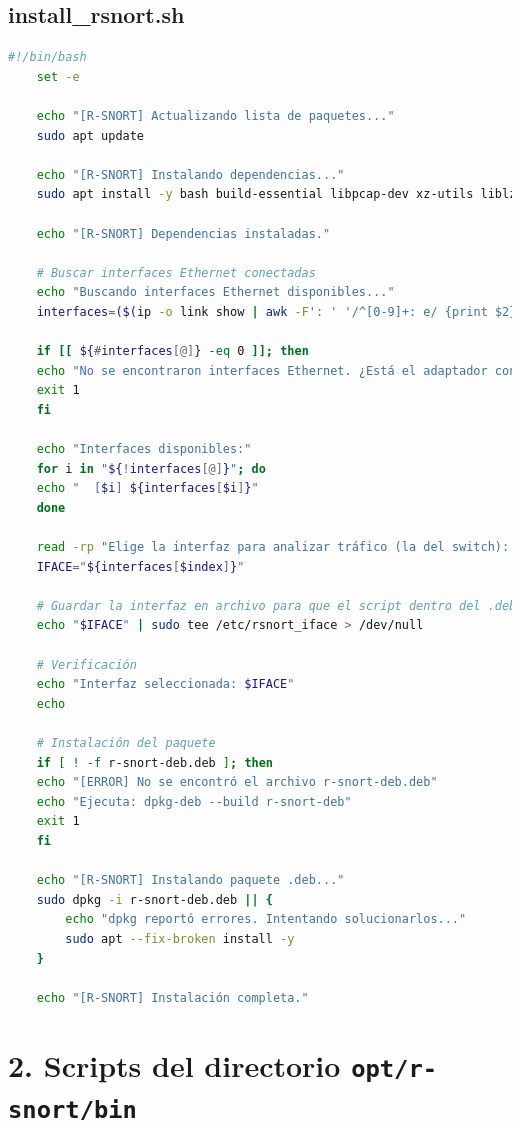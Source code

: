 \documentclass[11pt,a4paper,twoside]{report}
\begin{document}
\subsection*{install\_rsnort.sh}
\begin{lstlisting}[language=bash, caption={Script principal install\_rsnort.sh}, label={lst:install-rsnort}]
	#!/bin/bash
	set -e
	
	echo "[R-SNORT] Actualizando lista de paquetes..."
	sudo apt update
	
	echo "[R-SNORT] Instalando dependencias..."
	sudo apt install -y bash build-essential libpcap-dev xz-utils liblzma-dev clamav clamav-daemon
	
	echo "[R-SNORT] Dependencias instaladas."
	
	# Buscar interfaces Ethernet conectadas
	echo "Buscando interfaces Ethernet disponibles..."
	interfaces=($(ip -o link show | awk -F': ' '/^[0-9]+: e/ {print $2}'))
	
	if [[ ${#interfaces[@]} -eq 0 ]]; then
	echo "No se encontraron interfaces Ethernet. ¿Está el adaptador conectado?"
	exit 1
	fi
	
	echo "Interfaces disponibles:"
	for i in "${!interfaces[@]}"; do
	echo "  [$i] ${interfaces[$i]}"
	done
	
	read -rp "Elige la interfaz para analizar tráfico (la del switch): " index
	IFACE="${interfaces[$index]}"
	
	# Guardar la interfaz en archivo para que el script dentro del .deb la use
	echo "$IFACE" | sudo tee /etc/rsnort_iface > /dev/null
	
	# Verificación
	echo "Interfaz seleccionada: $IFACE"
	echo
	
	# Instalación del paquete
	if [ ! -f r-snort-deb.deb ]; then
	echo "[ERROR] No se encontró el archivo r-snort-deb.deb"
	echo "Ejecuta: dpkg-deb --build r-snort-deb"
	exit 1
	fi
	
	echo "[R-SNORT] Instalando paquete .deb..."
	sudo dpkg -i r-snort-deb.deb || {
		echo "dpkg reportó errores. Intentando solucionarlos..."
		sudo apt --fix-broken install -y
	}
	
	echo "[R-SNORT] Instalación completa."
\end{lstlisting}

\section*{2. Scripts del directorio \texttt{opt/r-snort/bin}}
\end{document}
